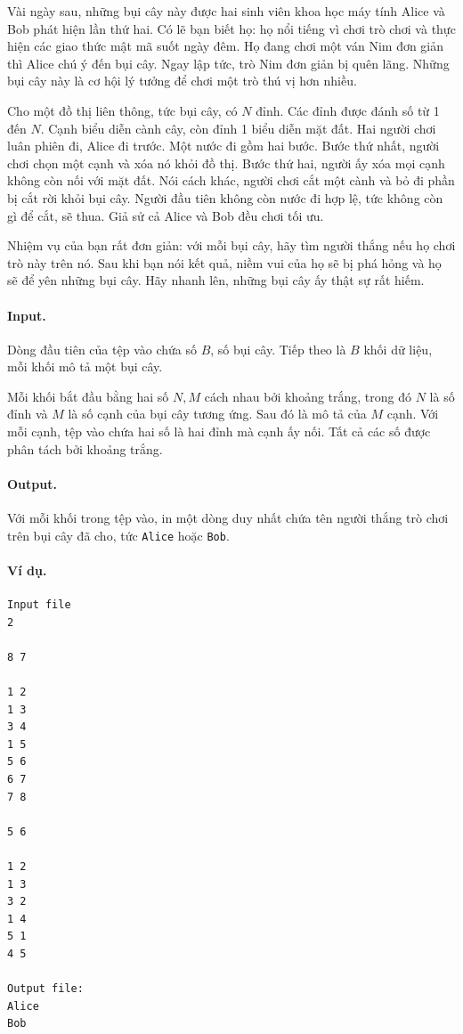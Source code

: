 \documentclass[11pt]{article}
\begin{document}
Vài ngày sau, những bụi cây này được hai sinh viên khoa học máy tính Alice và
Bob phát hiện lần thứ hai. Có lẽ bạn biết họ: họ nổi tiếng vì chơi trò chơi và
thực hiện các giao thức mật mã suốt ngày đêm. Họ đang chơi một ván Nim đơn
giản thì Alice chú ý đến bụi cây. Ngay lập tức, trò Nim đơn giản bị quên lãng.
Những bụi cây này là cơ hội lý tưởng để chơi một trò thú vị hơn nhiều.

Cho một đồ thị liên thông, tức bụi cây, có \(N\) đỉnh. Các đỉnh được đánh số từ
1 đến \(N\). Cạnh biểu diễn cành cây, còn đỉnh 1 biểu diễn mặt đất. Hai người
chơi luân phiên đi, Alice đi trước. Một nước đi gồm hai bước. Bước thứ nhất,
người chơi chọn một cạnh và xóa nó khỏi đồ thị. Bước thứ hai, người ấy xóa mọi
cạnh không còn nối với mặt đất. Nói cách khác, người chơi cắt một cành và bỏ
đi phần bị cắt rời khỏi bụi cây. Người đầu tiên không còn nước đi hợp lệ, tức
không còn gì để cắt, sẽ thua. Giả sử cả Alice và Bob đều chơi tối ưu.

Nhiệm vụ của bạn rất đơn giản: với mỗi bụi cây, hãy tìm người thắng nếu họ chơi
trò này trên nó. Sau khi bạn nói kết quả, niềm vui của họ sẽ bị phá hỏng và họ
sẽ để yên những bụi cây. Hãy nhanh lên, những bụi cây ấy thật sự rất hiếm.

\paragraph{Input.}
Dòng đầu tiên của tệp vào chứa số \(B\), số bụi cây. Tiếp theo là \(B\) khối dữ
liệu, mỗi khối mô tả một bụi cây.

Mỗi khối bắt đầu bằng hai số \(N,M\) cách nhau bởi khoảng trắng, trong đó \(N\)
là số đỉnh và \(M\) là số cạnh của bụi cây tương ứng. Sau đó là mô tả của
\(M\) cạnh. Với mỗi cạnh, tệp vào chứa hai số là hai đỉnh mà cạnh ấy nối. Tất
cả các số được phân tách bởi khoảng trắng.

\paragraph{Output.}
Với mỗi khối trong tệp vào, in một dòng duy nhất chứa tên người thắng trò chơi
trên bụi cây đã cho, tức \texttt{Alice} hoặc \texttt{Bob}.

\paragraph{Ví dụ.}
\begin{verbatim}
Input file
2

8 7

1 2
1 3
3 4
1 5
5 6
6 7
7 8

5 6

1 2
1 3
3 2
1 4
5 1
4 5

Output file:
Alice
Bob
\end{verbatim}
\end{document}

